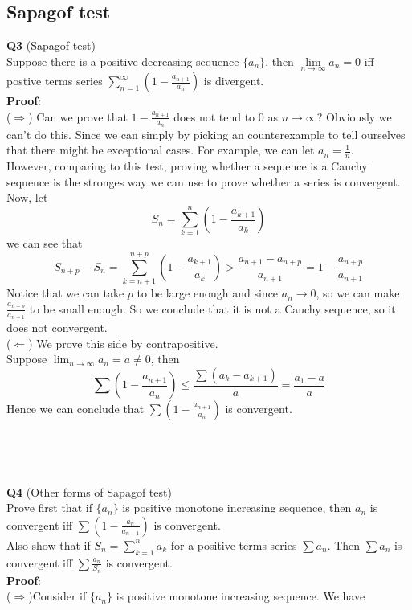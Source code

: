 \documentclass{article}
\begin{document}
\subsection{Sapagof test}
\textbf{Q3} (Sapagof test)\\
Suppose there is a positive decreasing sequence $\{a_n\}$, then $\lim\limits_{n \to \infty} a_n = 0$ iff postive terms series
$\sum_{n=1}^{\infty} (1-\frac{a_{n+1}}{a_n})$ is divergent.\\
\textbf{Proof}: \\
($\Longrightarrow$) Can we prove that $1 - \frac{a_{n+1}}{a_n}$ does not tend to 0 as $n \rightarrow \infty$? Obviously we can't do this. Since we can simply by
picking an counterexample to tell ourselves that there might be exceptional cases. For example, we can let $a_n = \frac{1}{n}$.\\
However, comparing to this test, proving whether a sequence is a Cauchy sequence is the stronges way we can use to prove whether a series is convergent.\\
Now, let 
$$
S_n = \sum_{k=1}^{n} (1-\frac{a_{k+1}}{a_k})
$$
we can see that
$$
S_{n+p} - S_n = \sum_{k=n+1}^{n+p}(1-\frac{a_{k+1}}{a_k}) > \frac{a_{n+1}-a_{n+p}}{a_{n+1}} = 1-\frac{a_{n+p}}{a_{n+1}}
$$
Notice that we can take $p$ to be large enough and since $a_n \rightarrow 0$, so we can make $\frac{a_{n+p}}{a_{n+1}}$ to be small enough. So we conclude that 
it is not a Cauchy sequence, so it does not convergent.\\
($\Longleftarrow$) We prove this side by contrapositive.\\
Suppose $\lim_{n \to \infty} a_n = a \ne 0$, then
$$
\sum (1-\frac{a_{n+1}}{a_n}) \leq \frac{\sum (a_k - a_{k+1})}{a} = \frac{a_1 - a }{a}
$$
Hence we can conclude that $\sum (1-\frac{a_{n+1}}{a_n})$ is convergent.\\
\\
\\
\\
\\
\textbf{Q4} (Other forms of Sapagof test) \\
Prove first that if $\{a_n\}$ is positive monotone increasing sequence, then $a_n$ is convergent iff $\sum (1-\frac{a_n}{a_{n+1}})$ is 
convergent.\\
Also show that if $S_n = \sum_{k=1}^{n} a_k$ for a positive terms series $\sum a_n$. Then $\sum a_n$ is convergent iff $\sum \frac{a_n}{S_n}$ is convergent.\\
\textbf{Proof}: \\
($\Longrightarrow$)Consider if $\{a_n\}$ is positive monotone increasing sequence. We have 
\end{document}

